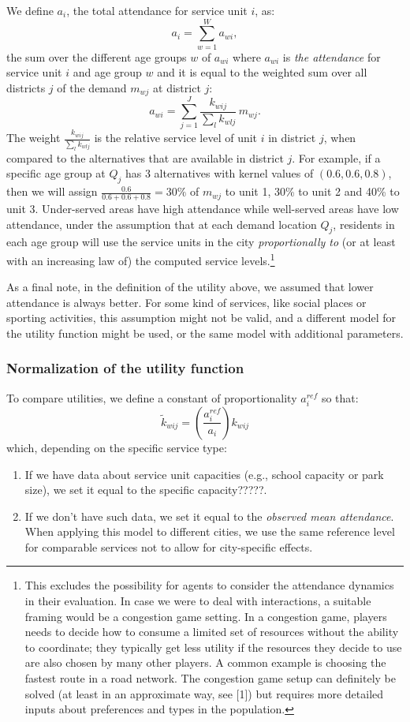 \documentclass{article}
\begin{document}
We define $a_i$, the total attendance for service unit $i$, as: 
\[a_i=\sum_{w=1}^W a_{wi},\] 
the sum over the different age groups $w$ of $a_{wi}$ where $a_{wi}$ is \textit{the attendance} for service unit $i$ and age group $w$ and it is equal to the weighted sum over all districts $j$ of the demand $m_{wj}$ at district $j$:
    \[a_{wi}=\sum_{j=1}^J{\frac{k_{wij}}{\sum_l{k_{wlj}}} \, m_{wj}}.\]
    The weight $\frac{k_{wij}}{\sum_l{k_{wlj}}}$ is the relative service level of unit $i$ in district $j$, when compared to the alternatives that are available in district $j$. For example, if a specific age group at $Q_j$ has 3 alternatives with kernel values of $(0.6, 0.6, 0.8)$, then we will assign $\frac{0.6}{0.6+0.6+0.8}=30\%$ of $m_{wj}$ to unit 1, 30\% to unit 2 and 40\% to unit 3.
 Under-served areas have high attendance while well-served areas have low attendance, under the assumption that at each demand location $Q_j$, residents in each age group will use the service units in the city \textit{proportionally to} (or at least with an increasing law of) the computed service levels.\footnote{This excludes the possibility for agents to consider the attendance dynamics in their evaluation. In case we were to deal with interactions, a suitable framing would be a congestion game setting. In a congestion game, players needs to decide how to consume a limited set of resources without the ability to coordinate; they typically get less utility if the resources they decide to use are also chosen by many other players. A common example is choosing the fastest route in a road network.
The congestion game setup can definitely be solved (at least in an approximate way, see [1]) but requires more detailed inputs about preferences and types in the population.}
 
 As a final note, in the definition of the utility above, we assumed that lower attendance is always better. For some kind of services, like social places or sporting activities, this assumption might not be valid,
and a different model for the utility function might be used, or the same model with additional parameters.

    
\subsubsection{Normalization of the utility function}

To compare utilities, we define a constant of proportionality $a_i^{ref}$ so that:
 \[\widetilde{k}_{wij} = \left(\frac{a_i^{ref}}{a_i}\right)k_{wij}\]
which, depending on the specific service type:
\begin{enumerate}
    \item If we have data about service unit capacities (e.g., school capacity or park size), we set it equal to the specific capacity?????.
    \item If we don't have such data, we set it equal to the \textit{observed mean attendance}. When applying this model to different cities, we use the same reference level for comparable services not to allow for city-specific effects.
\end{enumerate}
\end{document}
